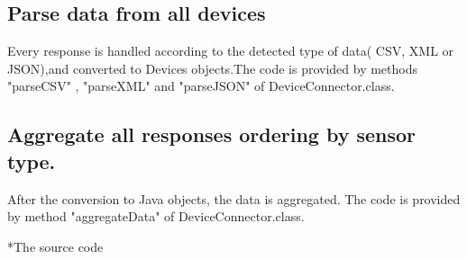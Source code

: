 \documentclass[12pt]{article}
\begin{document}
	\subsection{Parse data from all devices}
	Every response is handled according to the detected type of data( CSV, XML or JSON),and converted to Devices objects.The code is provided by methods "parseCSV" , "parseXML" and "parseJSON" of DeviceConnector.class.
	
	\subsection{Aggregate all responses ordering by sensor type.}
	After the conversion to Java objects, the data is aggregated. The code is provided by method "aggregateData" of DeviceConnector.class.
	
	*The source code
	
	
	
	
	
	
\end{document}
